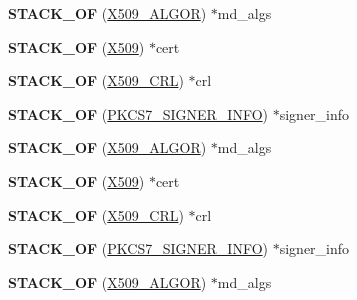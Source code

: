 \begin{DoxyCompactItemize}
{\bfseries S\+T\+A\+C\+K\+\_\+\+OF} (\hyperlink{structX509__algor__st}{X509\+\_\+\+A\+L\+G\+OR}) $\ast$md\+\_\+algs
\item 
\mbox{\label{structpkcs7__signed__st_a65d24e39f334b42fa460d9d7a87398ef}} 
{\bfseries S\+T\+A\+C\+K\+\_\+\+OF} (\hyperlink{structx509__st}{X509}) $\ast$cert
\item 
\mbox{\label{structpkcs7__signed__st_ac57f323e546efcca576407ecebd2177a}} 
{\bfseries S\+T\+A\+C\+K\+\_\+\+OF} (\hyperlink{structX509__crl__st}{X509\+\_\+\+C\+RL}) $\ast$crl
\item 
\mbox{\label{structpkcs7__signed__st_a4580e59fda0e62101ecc513a43512cee}} 
{\bfseries S\+T\+A\+C\+K\+\_\+\+OF} (\hyperlink{structpkcs7__signer__info__st}{P\+K\+C\+S7\+\_\+\+S\+I\+G\+N\+E\+R\+\_\+\+I\+N\+FO}) $\ast$signer\+\_\+info
\item 
\mbox{\label{structpkcs7__signed__st_a050bcf61058179b5d869b55e7e357816}} 
{\bfseries S\+T\+A\+C\+K\+\_\+\+OF} (\hyperlink{structX509__algor__st}{X509\+\_\+\+A\+L\+G\+OR}) $\ast$md\+\_\+algs
\item 
\mbox{\label{structpkcs7__signed__st_a65d24e39f334b42fa460d9d7a87398ef}} 
{\bfseries S\+T\+A\+C\+K\+\_\+\+OF} (\hyperlink{structx509__st}{X509}) $\ast$cert
\item 
\mbox{\label{structpkcs7__signed__st_ac57f323e546efcca576407ecebd2177a}} 
{\bfseries S\+T\+A\+C\+K\+\_\+\+OF} (\hyperlink{structX509__crl__st}{X509\+\_\+\+C\+RL}) $\ast$crl
\item 
\mbox{\label{structpkcs7__signed__st_a4580e59fda0e62101ecc513a43512cee}} 
{\bfseries S\+T\+A\+C\+K\+\_\+\+OF} (\hyperlink{structpkcs7__signer__info__st}{P\+K\+C\+S7\+\_\+\+S\+I\+G\+N\+E\+R\+\_\+\+I\+N\+FO}) $\ast$signer\+\_\+info
\item 
\mbox{\label{structpkcs7__signed__st_a050bcf61058179b5d869b55e7e357816}} 
{\bfseries S\+T\+A\+C\+K\+\_\+\+OF} (\hyperlink{structX509__algor__st}{X509\+\_\+\+A\+L\+G\+OR}) $\ast$md\+\_\+algs
\item 

\end{DoxyCompactItemize}
